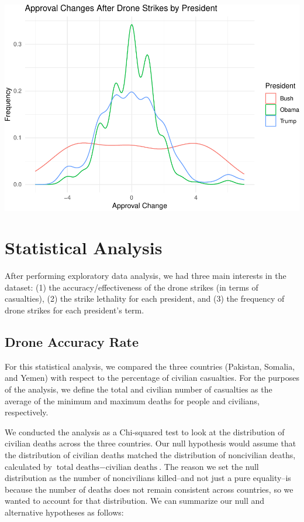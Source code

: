 \documentclass[
]{article}
\begin{document}
\begin{center}\includegraphics[width=0.75\linewidth]{strike-report_files/figure-latex/strike-approval-change-1} \end{center}

\hypertarget{statistical-analysis}{%
\section{Statistical Analysis}\label{statistical-analysis}}

After performing exploratory data analysis, we had three main interests
in the dataset: (1) the accuracy/effectiveness of the drone strikes (in
terms of casualties), (2) the strike lethality for each president, and
(3) the frequency of drone strikes for each president's term.

\hypertarget{drone-accuracy-rate}{%
\subsection{Drone Accuracy Rate}\label{drone-accuracy-rate}}

For this statistical analysis, we compared the three countries
(Pakistan, Somalia, and Yemen) with respect to the percentage of
civilian casualties. For the purposes of the analysis, we define the
total and civilian number of casualties as the average of the minimum
and maximum deaths for people and civilians, respectively.

We conducted the analysis as a Chi-squared test to look at the
distribution of civilian deaths across the three countries. Our null
hypothesis would assume that the distribution of civilian deaths matched
the distribution of noncivilian deaths, calculated by
\(\text{total deaths} - \text{civilian deaths}\). The reason we set the
null distribution as the number of noncivilians killed--and not just a
pure equality--is because the number of deaths does not remain
consistent across countries, so we wanted to account for that
distribution. We can summarize our null and alternative hypotheses as
follows:
\end{document}
